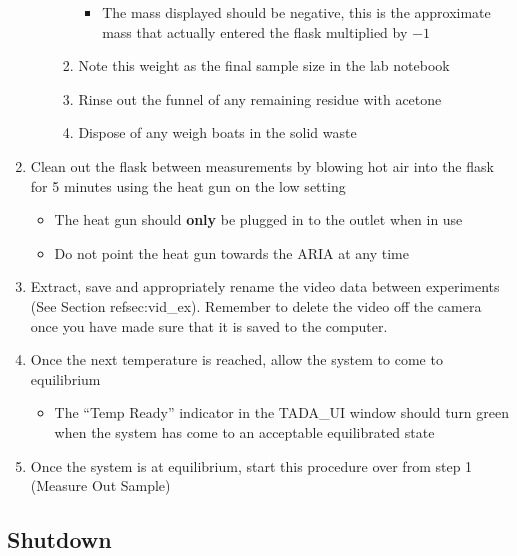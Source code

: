 \begin{enumerate}
\begin{itemize}
\begin{enumerate}
      \begin{itemize}
      \tightlist
      \item
        The mass displayed should be negative, this is the approximate
        mass that actually entered the flask multiplied by \(-1\)
      \end{itemize}
    \item
      Note this weight as the final sample size in the lab notebook
    \item
      Rinse out the funnel of any remaining residue with acetone
    \item
      Dispose of any weigh boats in the solid waste
    \end{enumerate}
  \end{itemize}
\item
  Clean out the flask between measurements by blowing hot air into the
  flask for 5 minutes using the heat gun on the low setting

  \begin{itemize}
  \tightlist
  \item
    The heat gun should \textbf{only} be plugged in to the outlet when
    in use
  \item
    Do not point the heat gun towards the ARIA at any time
  \end{itemize}
\item
  Extract, save and appropriately rename the video data between
  experiments (See Section refsec:vid\_ex). Remember to delete the video
  off the camera once you have made sure that it is saved to the
  computer.
\item
  Once the next temperature is reached, allow the system to come to
  equilibrium

  \begin{itemize}
  \tightlist
  \item
    The ``Temp Ready'' indicator in the TADA\_UI window should turn
    green when the system has come to an acceptable equilibrated state
  \end{itemize}
\item
  Once the system is at equilibrium, start this procedure over from step
  1 (Measure Out Sample)
\end{enumerate}

\hypertarget{shutdown}{%
\subsection{Shutdown}\label{shutdown}}

